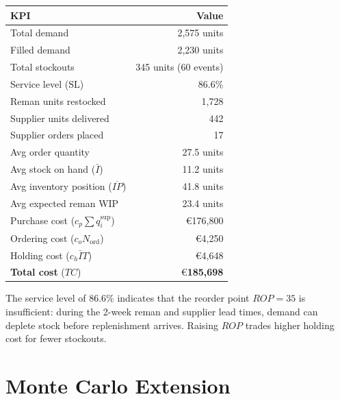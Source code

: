 \documentclass[11pt]{article}
\begin{document}
\begin{center}
\begin{tabular}{lr}
\toprule
KPI & Value \\
\midrule
Total demand              & 2{,}575 units \\
Filled demand             & 2{,}230 units \\
Total stockouts           & 345 units (60 events) \\
Service level ($\mathrm{SL}$) & 86.6\% \\
Reman units restocked     & 1{,}728 \\
Supplier units delivered  & 442 \\
Supplier orders placed    & 17 \\
Avg order quantity        & 27.5 units \\
Avg stock on hand ($\bar{I}$) & 11.2 units \\
Avg inventory position ($\overline{IP}$) & 41.8 units \\
Avg expected reman WIP    & 23.4 units \\
\midrule
Purchase cost ($c_p \sum q_i^{\mathrm{sup}}$) & \euro176{,}800 \\
Ordering cost ($c_o N_{\mathrm{ord}}$)        & \euro4{,}250 \\
Holding cost ($c_h \bar{I} T$)                & \euro4{,}648 \\
\textbf{Total cost} ($TC$)                    & \euro\textbf{185{,}698} \\
\bottomrule
\end{tabular}
\end{center}

The service level of $86.6\%$ indicates that the reorder point $ROP = 35$ is
insufficient: during the 2-week reman and supplier lead times, demand can deplete
stock before replenishment arrives.  Raising $ROP$ trades higher holding cost for
fewer stockouts.

\section{Monte Carlo Extension}
\end{document}
